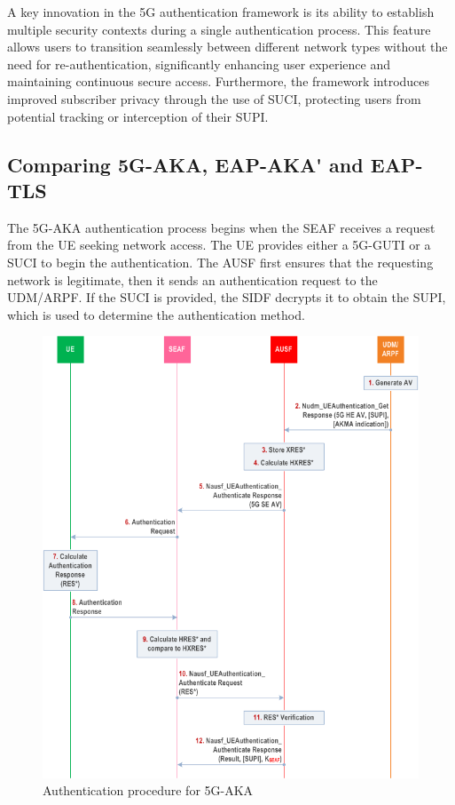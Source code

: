 A key innovation in the \ac{5G} authentication framework is its ability to establish multiple security contexts during a single authentication process. This feature allows users to transition seamlessly between different network types without the need for re-authentication, significantly enhancing user experience and maintaining continuous secure access. Furthermore, the framework introduces improved subscriber privacy through the use of \ac{SUCI}, protecting users from potential tracking or interception of their \ac{SUPI}.%

\subsection{Comparing \ac{5G-AKA}, \ac{EAP-AKA'} and \ac{EAP-TLS}}

The \ac{5G-AKA} authentication process begins when the \ac{SEAF} receives a request from the \ac{UE} seeking network access. The \ac{UE} provides either a \ac{5G-GUTI} or a \ac{SUCI} to begin the authentication. The \ac{AUSF} first ensures that the requesting network is legitimate, then it sends an authentication request to the \ac{UDM}/\ac{ARPF}. If the \ac{SUCI} is provided, the \ac{SIDF} decrypts it to obtain the \ac{SUPI}, which is used to determine the authentication method.%

\begin{figure}
    \centering
    \includegraphics[width=0.75\linewidth]{figs/Authentication procedure for 5G AKA.png}
    \caption{Authentication procedure for \ac{5G-AKA}}
    \label{fig:Authentication procedure for 5G AKA}
\end{figure}


